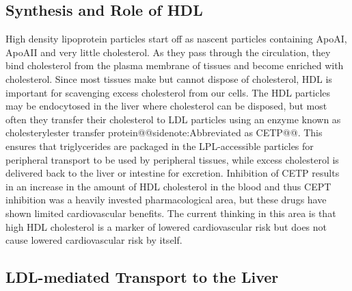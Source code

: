 \documentclass{tufte-handout}
\makeatletter
\def\sidenote#1{@@sidenote:#1@@}
\makeatother
\begin{document}
\subsection{Synthesis and Role of HDL}

High density lipoprotein particles start off as nascent particles containing ApoAI, ApoAII and very little cholesterol.  As they pass through the circulation, they bind cholesterol from the plasma membrane of tissues and become enriched with cholesterol.  Since most tissues make but cannot dispose of cholesterol, HDL is important for scavenging excess cholesterol from our cells. The HDL particles may be endocytosed in the liver where cholesterol can be disposed, but most often they transfer their cholesterol to LDL particles using an enzyme known as cholesterylester transfer protein\sidenote{Abbreviated as CETP}.  This ensures that triglycerides are packaged in the LPL-accessible particles for peripheral transport to be used by peripheral tissues, while excess cholesterol is delivered back to the liver or intestine for excretion.   Inhibition of CETP results in an increase in the amount of  HDL cholesterol in the blood and thus CEPT inhibition was a heavily invested pharmacological area, but these drugs have shown limited cardiovascular benefits.  The current thinking in this area is that high HDL cholesterol is a marker of lowered cardiovascular risk but does not cause lowered cardiovascular risk by itself.

\subsection{LDL-mediated Transport to the Liver}
\end{document}
